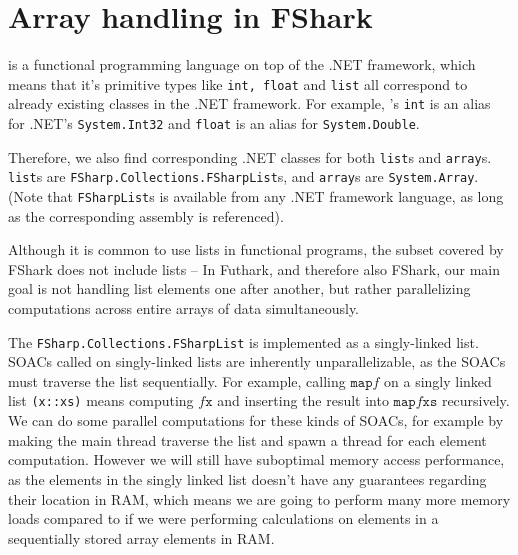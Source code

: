 \chapter{Array handling in FShark}
\fsharp{} is a functional programming language on top of the .NET framework, which
means that it's primitive types like \texttt{int, float} and \texttt{list} all
correspond to already existing classes in the .NET framework. For example,
\fsharp{}'s \texttt{int} is an alias for .NET's \texttt{System.Int32} and
\texttt{float} is an alias for \texttt{System.Double}.

Therefore, we also find corresponding .NET classes for both \fsharp{}
\texttt{list}s and \texttt{array}s. \texttt{list}s are
\texttt{FSharp.Collections.FSharpList}s, and \texttt{array}s are
\texttt{System.Array}. (Note that \texttt{FSharpList}s is available from any
.NET framework language, as long as the corresponding assembly is referenced).

Although it is common to use lists in functional programs, the \fsharp{} subset
covered by FShark does not include lists -- In Futhark, and therefore also
FShark, our main goal is not handling list elements one after another, but
rather parallelizing computations across entire arrays of data simultaneously.

The \texttt{FSharp.Collections.FSharpList} is implemented as a singly-linked
list. SOACs called on singly-linked lists are inherently unparallelizable, as
the SOACs must traverse the list sequentially.
For example, calling $\texttt{map} f$ on a singly linked list \texttt{(x::xs)}
means computing $f \texttt{x}$ and inserting the result into $\texttt{map} f
\texttt{xs}$ recursively. We can do some parallel computations for these kinds
of SOACs, for example by making the main thread traverse the list and spawn
a thread for each element computation. However we will still have suboptimal
memory access performance, as the elements in the singly linked list doesn't
have any guarantees regarding their location in RAM, which means we are going to
perform many more memory loads compared to if we were performing calculations on
elements in a sequentially stored array elements in RAM.












